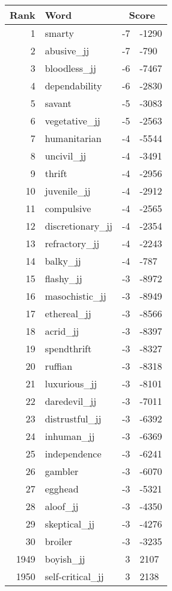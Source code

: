 \begin{longtable}[!htbp]{| rlr@{.}l |}
    \hline
    \textbf{Rank} & \textbf{Word} & \multicolumn{2}{c|}{\textbf{Score}} \\
    \hline
    \endhead
    1 & smarty & -7 & -1290 \\
    2 & abusive\_jj & -7 & -790 \\
    3 & bloodless\_jj & -6 & -7467 \\
    4 & dependability & -6 & -2830 \\
    5 & savant & -5 & -3083 \\
    6 & vegetative\_jj & -5 & -2563 \\
    7 & humanitarian & -4 & -5544 \\
    8 & uncivil\_jj & -4 & -3491 \\
    9 & thrift & -4 & -2956 \\
    10 & juvenile\_jj & -4 & -2912 \\
    11 & compulsive & -4 & -2565 \\
    12 & discretionary\_jj & -4 & -2354 \\
    13 & refractory\_jj & -4 & -2243 \\
    14 & balky\_jj & -4 & -787 \\
    15 & flashy\_jj & -3 & -8972 \\
    16 & masochistic\_jj & -3 & -8949 \\
    17 & ethereal\_jj & -3 & -8566 \\
    18 & acrid\_jj & -3 & -8397 \\
    19 & spendthrift & -3 & -8327 \\
    20 & ruffian & -3 & -8318 \\
    21 & luxurious\_jj & -3 & -8101 \\
    22 & daredevil\_jj & -3 & -7011 \\
    23 & distrustful\_jj & -3 & -6392 \\
    24 & inhuman\_jj & -3 & -6369 \\
    25 & independence & -3 & -6241 \\
    26 & gambler & -3 & -6070 \\
    27 & egghead & -3 & -5321 \\
    28 & aloof\_jj & -3 & -4350 \\
    29 & skeptical\_jj & -3 & -4276 \\
    30 & broiler & -3 & -3235 \\
    1949 & boyish\_jj & 3 & 2107 \\
    1950 & self-critical\_jj & 3 & 2138 \\

\end{longtable}

